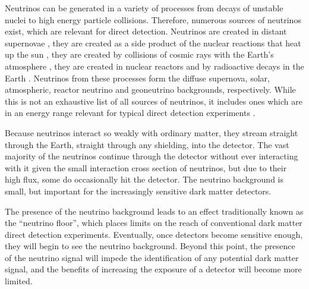 Neutrinos can be generated in a variety of processes from decays of unstable nuclei to high energy particle collisions. Therefore, numerous sources of neutrinos exist, which are relevant for direct detection. Neutrinos are created in distant supernovae \parencite{Beacom2010}, they are created as a side product of the nuclear reactions that heat up the sun \parencites{BergstromEtAl2016, OrebiGann2021}, they are created by collisions of cosmic rays with the Earth's atmosphere \parencite{BattistoniEtAl2005}, they are created in nuclear reactors \parencites{MuellerEtAl2011, MaEtAl2013} and by radioactive decays in the Earth \parencites{LudhovaZavatarelli2013, HuangEtAl2013}. Neutrinos from these processes form the diffuse supernova, solar, atmospheric, reactor neutrino and geoneutrino backgrounds, respectively. While this is not an exhaustive list of all sources of neutrinos, it includes ones which are in an energy range relevant for typical direct detection experiments \parencite{VitaglianoTamborraRaffelt2020}.

Because neutrinos interact so weakly with ordinary matter, they stream straight through the Earth, straight through any shielding, into the detector. The vast majority of the neutrinos continue through the detector without ever interacting with it given the small interaction cross section of neutrinos, but due to their high flux, some do occasionally hit the detector. The neutrino background is small, but important for the increasingly sensitive dark matter detectors.

The presence of the neutrino background leads to an effect traditionally known as the ``neutrino floor'', which places limits on the reach of conventional dark matter direct detection experiments. Eventually, once detectors become sensitive enough, they will begin to see the neutrino background. Beyond this point, the presence of the neutrino signal will impede the identification of any potential dark matter signal, and the benefits of increasing the exposure of a detector will become more limited.

